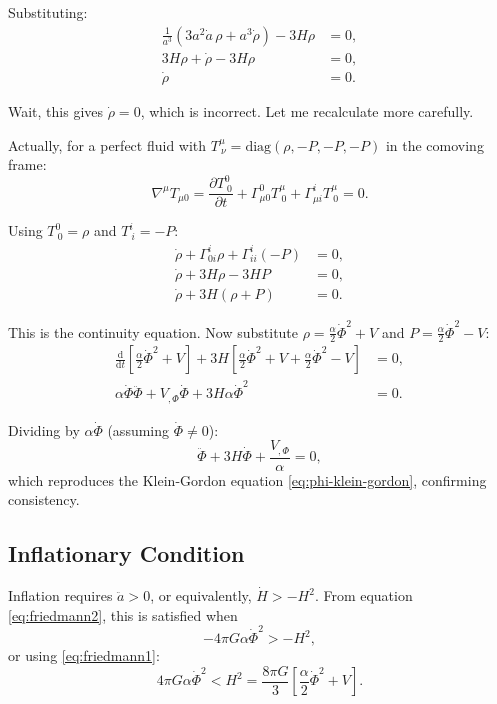 \documentclass[11pt,a4paper]{article}
\numberwithin{equation}{section}
\theoremstyle{plain}
\theoremstyle{definition}
\theoremstyle{remark}
\newcommand{\dd}{\mathrm{d}}
\begin{document}
Substituting:
\begin{align}
\frac{1}{a^3}\left(3a^2\dot{a}\,\rho + a^3\dot{\rho}\right) - 3H\rho &= 0,\\
3H\rho + \dot{\rho} - 3H\rho &= 0,\\
\dot{\rho} &= 0.
\end{align}

Wait, this gives $\dot{\rho} = 0$, which is incorrect. Let me recalculate more carefully.

Actually, for a perfect fluid with $T^\mu_{\ \nu} = \mathrm{diag}(\rho, -P, -P, -P)$ in the comoving frame:
\begin{equation}
\nabla^\mu T_{\mu 0} = \frac{\partial T^0_{\ 0}}{\partial t} + \Gamma^0_{\mu 0}T^\mu_{\ 0} + \Gamma^i_{\mu i}T^\mu_{\ 0} = 0.
\end{equation}

Using $T^0_{\ 0} = \rho$ and $T^i_{\ i} = -P$:
\begin{align}
\dot{\rho} + \Gamma^i_{0i}\rho + \Gamma^i_{ii}(-P) &= 0,\\
\dot{\rho} + 3H\rho - 3H P &= 0,\\
\dot{\rho} + 3H(\rho + P) &= 0.
\end{align}

This is the continuity equation. Now substitute $\rho = \frac{\alpha}{2}\dot{\Phi}^2 + V$ and $P = \frac{\alpha}{2}\dot{\Phi}^2 - V$:
\begin{align}
\frac{\dd}{\dd t}\left[\frac{\alpha}{2}\dot{\Phi}^2 + V\right] + 3H\left[\frac{\alpha}{2}\dot{\Phi}^2 + V + \frac{\alpha}{2}\dot{\Phi}^2 - V\right] &= 0,\\
\alpha\dot{\Phi}\ddot{\Phi} + V_{,\Phi}\dot{\Phi} + 3H\alpha\dot{\Phi}^2 &= 0.
\end{align}

Dividing by $\alpha\dot{\Phi}$ (assuming $\dot{\Phi} \neq 0$):
\begin{equation}
\ddot{\Phi} + 3H\dot{\Phi} + \frac{V_{,\Phi}}{\alpha} = 0,
\label{eq:continuity-to-KG}
\end{equation}
which reproduces the Klein-Gordon equation \eqref{eq:phi-klein-gordon}, confirming consistency.

\subsection{Inflationary Condition}

Inflation requires $\ddot{a} > 0$, or equivalently, $\dot{H} > -H^2$. From equation \eqref{eq:friedmann2}, this is satisfied when
\begin{equation}
-4\pi G\alpha\dot{\Phi}^2 > -H^2,
\end{equation}
or using \eqref{eq:friedmann1}:
\begin{equation}
4\pi G\alpha\dot{\Phi}^2 < H^2 = \frac{8\pi G}{3}\left[\frac{\alpha}{2}\dot{\Phi}^2 + V\right].
\end{equation}
\end{document}

